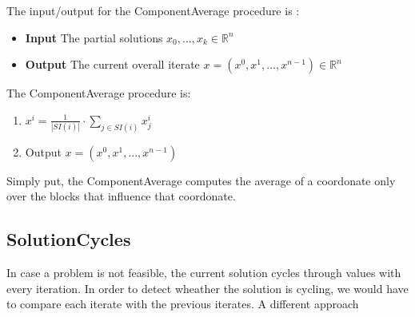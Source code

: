\documentclass[a4paper,twoside,10pt]{report}
\begin{document}
	The input/output for the ComponentAverage procedure is :
	
	\begin{itemize}
		\item \textbf{Input} The partial solutions \(x_0, ..., x_k \in \mathbb{R} ^n\)
		\item \textbf{Output} The current overall iterate \(x = (x^0, x^1,..., x^{n-1})\in \mathbb{R} ^n\)
	\end{itemize}	
	
	The ComponentAverage procedure is:
	
	\begin{enumerate}
		\item \(x^i = \frac{1}{|SI(i)|} \cdot \sum_{j\in SI(i)} {x^i_j}\)
		\item Output \(x = (x^0, x^1, ..., x^{n-1})\)
	\end{enumerate}		
	
	
	Simply put, the ComponentAverage computes the average of a coordonate only over the blocks that influence that coordonate.
		
	\subsection{SolutionCycles}
	
	In case a problem is not feasible, the current solution cycles through values with every iteration. In order to detect wheather the solution is cycling, we would have to compare each iterate with the previous iterates. A different approach 
	



\clearpage
{}
\listoffigures

\clearpage
{}
\listoftables


\appendix

\end{document}
